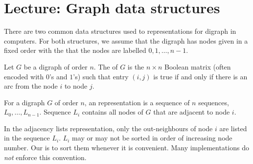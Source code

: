 %
%
%
%




 

\chapter{Lecture: Graph data structures} \label{sec:graph-reps}

There are two common data structures used to representations for digraph in computers. For both structures, we assume
that the digraph has nodes given in a fixed order with the
 that the nodes are labelled $0, 1, \dots, n - 1$.

\begin{Definition}
Let $G$ be a digraph of order $n$. The  of $G$
is the $n\times n$ Boolean matrix (often encoded with $0$'s and $1$'s)
such that entry $(i, j)$ is true if and only if there is an arc from the
node $i$ to node $j$.
\end{Definition}

\begin{Definition}
For a digraph $G$ of order $n$, an 
representation is a sequence of $n$ sequences, $L_0, \dots, L_{n-1}$. 
Sequence $L_i$ contains all nodes of $G$ that are adjacent to node $i$.
\end{Definition}

In the adjacency lists representation, only the out-neighbours of node $i$ are listed in the sequence $L_i$. 
$L_i$ may or may not be sorted in order of increasing node number. 
Our  is to sort them whenever it is convenient. 
Many implementations do \emph{not} enforce this convention.

